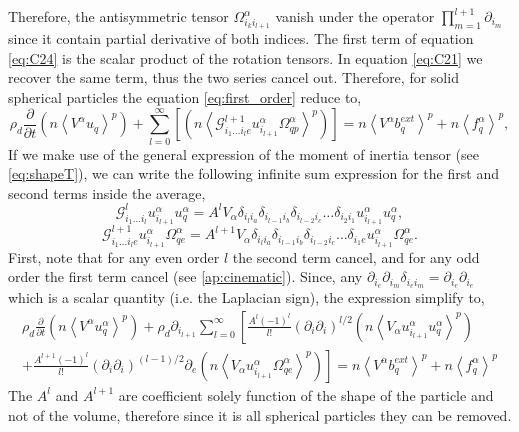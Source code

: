 {Therefore, the antisymmetric tensor $\Omega_{i_ki_{l+1}}^\alpha$ vanish under the operator $\prod^{l+1}_{m=1} \partial_{i_m}$ since it contain partial derivative of both indices.
The first term of equation \ref{eq:C24} is the scalar product of the rotation tensors.
In equation \ref{eq:C21} we recover the same term, thus the two series cancel out.
Therefore, for solid spherical particles the equation \ref{eq:first_order} reduce to,
\begin{equation*}
    \rho_d \frac{\partial}{\partial t} \left(n\left<V^\alpha u_q\right>^p\right)
    +\sum_{l=0}^\infty \left[
        \left(n
        \left<
            \mathcal{G}_{i_1\ldots i_l e}^{l+1} u^\alpha_{i_{l+1}}\Omega_{qp}^\alpha
        \right>^p\right)
    \right]
    = n \left<V^\alpha b^{ext}_q\right>^p
    + n\left<f_q^\alpha\right>^p,
\end{equation*}
If we make use of the general expression of the moment of inertia tensor (see \ref{eq:shapeT}), we can write the following infinite sum expression for the first and second terms inside the average, 
\begin{equation*}
    \mathcal{G}_{i_1\ldots i_l}^l u^\alpha_{i_{l+1}} u^\alpha_q
    = A^l V_\alpha
    \delta_{i_l i_a}
    \delta_{i_{l-1} i_b}
    \delta_{i_{l-2} i_c}
    \ldots
    \delta_{i_2i_1}
    u^\alpha_{i_{l+1}} u^\alpha_q,
\end{equation*}
\begin{equation*}
    \mathcal{G}_{i_1\ldots i_l e}^{l+1} u^\alpha_{i_{l+1}}\Omega_{qe}^\alpha
    = A^{l+1} V_\alpha
    \delta_{i_l i_a}
    \delta_{i_{l-1} i_b}
    \delta_{i_{l-2} i_c}
    \ldots
    \delta_{i_1e}
    u^\alpha_{i_{l+1}}\Omega_{qe}^\alpha.
\end{equation*}
First, note that for any even order $l$ the second term cancel, and for any odd order the first term cancel (see \ref{ap:cinematic}). 
Since, any $\partial_{i_e} \partial_{i_m} \delta_{i_ei_m} = \partial_{i_e}\partial_{i_e}$ which is a scalar quantity (i.e. the Laplacian sign), the expression simplify to,
\begin{multline*}
    \rho_d \frac{\partial}{\partial t} \left(n\left<V^\alpha u_q^\alpha\right>^p\right)
    +\rho_d\partial_{i_{l+1}} \sum_{l=0}^\infty 
    \left[
        \frac{A^l(-1)^l}{l!}
        (\partial_i\partial_i)^{l/2}
        \left(n 
        \left<V_\alpha u^\alpha_{i_{l+1}} u^\alpha_q \right>^p
        \right)
     \right.\\
     \left.
        +
        \frac{A^{l+1}(-1)^l}{l!}
        (\partial_i\partial_i)^{(l-1)/2}\partial_e 
        \left(n 
        \left<V_\alpha u^\alpha_{i_{l+1}}\Omega_{qe}^\alpha \right>^p
        \right)
    \right]
    = n \left<V^\alpha b^{ext}_q\right>^p
    + n\left<f_q^\alpha\right>^p
\end{multline*}
The $A^l$ and $A^{l+1}$ are coefficient solely function of the shape of the particle and not of the volume, therefore since it is all spherical particles they can be removed. 

}
